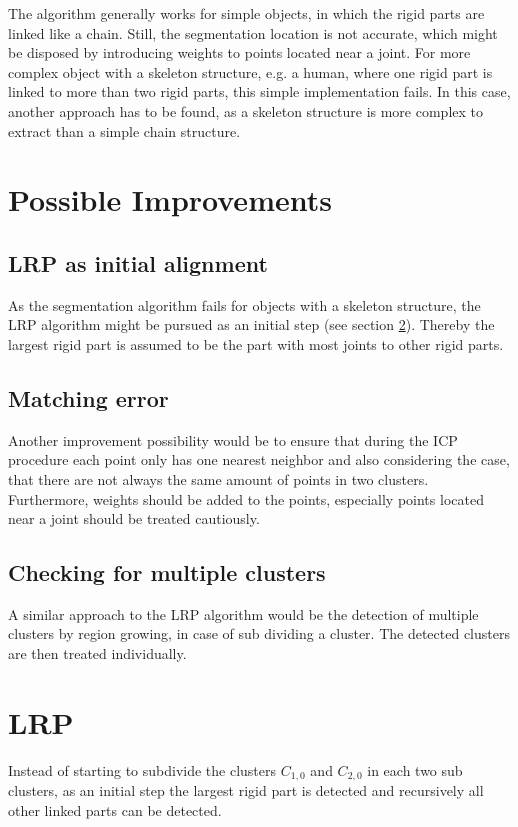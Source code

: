 The algorithm generally works for simple objects, in which the rigid parts are linked like a chain. Still, the segmentation location is not accurate, which might be disposed by introducing weights to points located near a joint. For more complex object with a skeleton structure, e.g. a human, where one rigid part is linked to more than two rigid parts, this simple implementation fails. In this case, another approach has to be found, as a skeleton structure is more complex to extract than a simple chain structure.

\section{Possible Improvements}

\subsection{LRP as initial alignment}
As the segmentation algorithm fails for objects with a skeleton structure, the LRP algorithm might be pursued as an initial step (see section \ref{sec:LRP}). Thereby the largest rigid part is assumed to be the part with most joints to other rigid parts. 

\subsection{Matching error}
Another improvement possibility would be to ensure that during the ICP procedure each point only has one nearest neighbor and also considering the case, that there are not always the same amount of points in two clusters. Furthermore, weights should be added to the points, especially points located near a joint should be treated cautiously. 

\subsection{Checking for multiple clusters}
A similar approach to the LRP algorithm \cite{guo2016correspondence} would be the detection of multiple clusters by region growing, in case of sub dividing a cluster. The detected clusters are then treated individually.

\section{LRP}
\label{sec:LRP}
Instead of starting to subdivide the clusters $C_{1,0}$ and $C_{2,0}$ in each two sub clusters, as an initial step the largest rigid part is detected and recursively all other linked parts can be detected.

